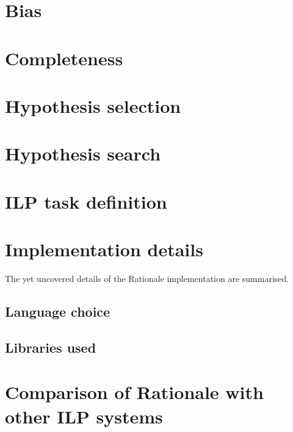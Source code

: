 \section{Bias}


\section{Completeness}

\section{Hypothesis selection}

\section{Hypothesis search}

\section{ILP task definition}

\section{Implementation details}
The yet uncovered details of the Rationale implementation are summarised.

\subsection{Language choice}

\subsection{Libraries used}

\section{Comparison of Rationale with other ILP systems}